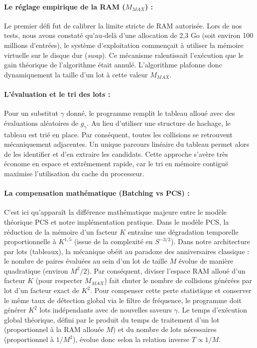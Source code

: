 \documentclass[a4paper,11pt]{article}
\begin{document}
\paragraph{Le réglage empirique de la RAM ($M_{MAX}$) :}
Le premier défi fut de calibrer la limite stricte de RAM autorisée. Lors de nos tests, nous avons constaté qu'au-delà d'une allocation de 2,3 Go (soit environ 100 millions d'entrées), le système d'exploitation commençait à utiliser la mémoire virtuelle sur le disque dur (\textit{swap}). Ce mécanisme ralentissait l'exécution que le gain théorique de l'algorithme était annulé. L'algorithme plafonne donc dynamiquement la taille d'un lot à cette valeur $M_{MAX}$.

\paragraph{L'évaluation et le tri des lots :}
Pour un substitut $\gamma$ donné, le programme remplit le tableau alloué avec des évaluations aléatoires de $g_{\gamma}$. Au lieu d'utiliser une structure de hachage, le tableau est trié en place. Par conséquent, toutes les collisions se retrouvent mécaniquement adjacentes. Un unique parcours linéaire du tableau permet alors de les identifier et d'en extraire les candidats. Cette approche s'avère très économe en espace et extrêmement rapide, car le tri en mémoire contiguë maximise l'utilisation du cache du processeur.

\paragraph{La compensation mathématique (Batching vs PCS) :}
C'est ici qu'apparaît la différence mathématique majeure entre le modèle théorique PCS et notre implémentation pratique. Dans le modèle PCS, la réduction de la mémoire d'un facteur $K$ entraîne une dégradation temporelle proportionnelle à $K^{1,5}$ (issue de la complexité en $S^{-3/2}$). Dans notre architecture par lots (tableaux), la mécanique obéit au paradoxe des anniversaires classique : le nombre de paires évaluées au sein d'un lot de taille $M$ évolue de manière quadratique (environ $M^2/2$). Par conséquent, diviser l'espace RAM alloué d'un facteur $K$ (pour respecter $M_{MAX}$) fait chuter le nombre de collisions générées par lot d'un facteur exact de $K^2$. Pour compenser cette perte statistique et conserver le même taux de détection global via le filtre de fréquence, le programme doit générer $K^2$ lots indépendants avec de nouvelles saveurs $\gamma$. Le temps d'exécution global théorique, défini par le produit du temps de traitement d'un lot (proportionnel à la RAM allouée $M$) et du nombre de lots nécessaires (proportionnel à $1/M^2$), évolue donc selon la relation inverse $T \propto 1/M$.
\end{document}
